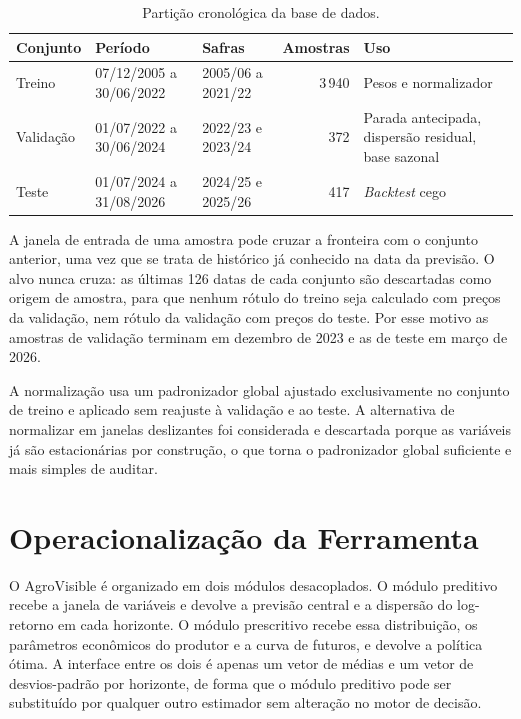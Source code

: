 \begin{table}[htb]
	\centering
	\caption{Partição cronológica da base de dados.}\label{tab:split}
	\small
	\begin{tabular}{l L{3.3cm} L{2.6cm} r L{4.2cm}}
		\hline
		\textbf{Conjunto} & \textbf{Período} & \textbf{Safras} & \textbf{Amostras} & \textbf{Uso} \\ \hline
		Treino & 07/12/2005 a 30/06/2022 & 2005/06 a 2021/22 & 3\,940 & Pesos e normalizador \\
		Validação & 01/07/2022 a 30/06/2024 & 2022/23 e 2023/24 & 372 & Parada antecipada, dispersão residual, base sazonal \\
		Teste & 01/07/2024 a 31/08/2026 & 2024/25 e 2025/26 & 417 & \textit{Backtest} cego \\ \hline
	\end{tabular}
\end{table}

A janela de entrada de uma amostra pode cruzar a fronteira com o conjunto anterior, uma vez que se trata de histórico já conhecido na data da previsão. O alvo nunca cruza: as últimas 126 datas de cada conjunto são descartadas como origem de amostra, para que nenhum rótulo do treino seja calculado com preços da validação, nem rótulo da validação com preços do teste. Por esse motivo as amostras de validação terminam em dezembro de 2023 e as de teste em março de 2026.

A normalização usa um padronizador global ajustado exclusivamente no conjunto de treino e aplicado sem reajuste à validação e ao teste. A alternativa de normalizar em janelas deslizantes foi considerada e descartada porque as variáveis já são estacionárias por construção, o que torna o padronizador global suficiente e mais simples de auditar.

\section{Operacionalização da Ferramenta}\label{sec2:operacionalizacao}

O AgroVisible é organizado em dois módulos desacoplados. O módulo preditivo recebe a janela de variáveis e devolve a previsão central e a dispersão do log-retorno em cada horizonte. O módulo prescritivo recebe essa distribuição, os parâmetros econômicos do produtor e a curva de futuros, e devolve a política ótima. A interface entre os dois é apenas um vetor de médias e um vetor de desvios-padrão por horizonte, de forma que o módulo preditivo pode ser substituído por qualquer outro estimador sem alteração no motor de decisão.

